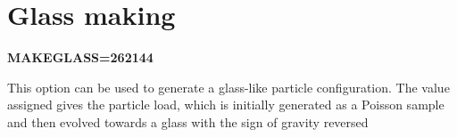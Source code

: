\par
 \hypertarget{Gadget-Makefile_secmake9}{}\section{\-Glass making}\label{Gadget-Makefile_secmake9}

\begin{DoxyItemize}
\item {\bfseries \-M\-A\-K\-E\-G\-L\-A\-S\-S=262144} \par
 \-This option can be used to generate a glass-\/like particle configuration. \-The value assigned gives the particle load, which is initially generated as a \-Poisson sample and then evolved towards a glass with the sign of gravity reversed 
\end{DoxyItemize}